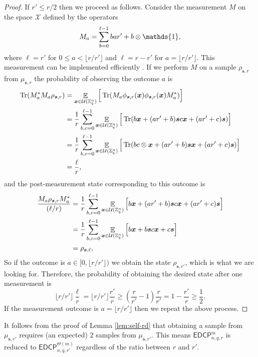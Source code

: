 \documentclass[11pt]{article}
\theoremstyle{plain}
\theoremstyle{definition}
\DeclareMathOperator{\tr}{Tr} %
\DeclareMathOperator{\E}{\mathbb{E}}
\let\ket\relax
\DeclarePairedDelimiter{\ket}{\lvert}{\rangle}
\let\bra\relax
\DeclarePairedDelimiter{\bra}{\langle}{\rvert}
\def\Z{\mathbb{Z}}
\def\edcp{\mathsf{EDCP}}
\def\X{\mathcal{X}}
\def\U{\mathcal{U}}
\begin{document}
\begin{proof}
    If $r' \le r / 2$ then we proceed as follows. Consider the measurement $M$ on the space $\X$ defined by the operators
    \[ M_a = \sum_{b = 0}^{\ell - 1} \ket{b}\bra{ar' + b} \otimes \mathds{1}, \]
    where $\ell = r'$ for $0 \le a < \lfloor r / r'  \rfloor$ and $\ell = r - r'$ for $a = \lfloor r / r'  \rfloor$. This measurement can be implemented efficiently \cite[\S A.8]{kaye2007introduction}. If we perform $M$ on a sample $\rho_{\bm{s}, r}$ from $\mu_{\bm{s}, r}$ the probability of observing the outcome $a$ is
    \begin{align*}
        \tr(M_a^*M_a \rho_{\bm{s}, r})
        & = \E_{\bm{x} \in \U(\Z_q^n)} \Big[ \tr(M_a \ket{\phi_{\bm{s}, r}(\bm{x})} \bra{\phi_{\bm{s}, r}(\bm{x})} M_a^*) \Big] \\
        & = \frac{1}{r} \sum_{b, c = 0}^{\ell - 1} \E_{\bm{x} \in \U(\Z_q^n)}\Big[ \tr(\ket{b}\ket{\bm{x} + (ar' + b)\bm{s}} \bra{c}\bra{\bm{x} + (ar' + c)\bm{s}}) \Big] \\
        & = \frac{1}{r} \sum_{b, c = 0}^{\ell - 1} \E_{\bm{x} \in \U(\Z_q^n)}\Big[ \tr(\ket{b}\bra{c} \otimes \ket{\bm{x} + (ar' + b)\bm{s}} \bra{\bm{x} + (ar' + c)\bm{s}}) \Big] \\
        & = \frac{\ell}{r},
    \end{align*}
    and the post-measurement state corresponding to this outcome is
    \begin{align*}
        \frac{M_a \rho_{\bm{s}, r} M_a^*}{(\ell / r)}
        & = \frac{1}{r} \sum_{b, c = 0}^{\ell - 1} \E_{\bm{x} \in \U(\Z_q^n)}\Big[ \ket{b}\ket{\bm{x} + (ar' + b)\bm{s}} \bra{c}\bra{\bm{x} + (ar' + c)\bm{s}} \Big] \\
        & = \frac{1}{r} \sum_{b, c = 0}^{\ell - 1} \E_{\bm{x} \in \U(\Z_q^n)}\Big[ \ket{b}\ket{\bm{x} + b\bm{s}} \bra{c}\bra{\bm{x} + c\bm{s}} \Big] \\
        & = \rho_{\bm{s}, \ell},
    \end{align*}
    So if the outcome is $a \in [0, \lfloor r / r'  \rfloor)$ we obtain the state $\rho_{\bm{s}, r'}$, which is what we are looking for. Therefore, the probability of obtaining the desired state after one measurement is
    \[ \lfloor r / r' \rfloor \frac{\ell}{r} = \lfloor r / r' \rfloor \frac{r'}{r} \ge \left( \frac{r}{r'} - 1 \right)\frac{r}{r'} = 1 - \frac{r'}{r} \ge \frac{1}{2}. \]
    If the measurement outcome is $a = \lfloor r / r' \rfloor$ then we repeat the above process.
\end{proof}
It follows from the proof of Lemma \ref{lem:self-rd} that obtaining a sample from $\mu_{\bm{s}, r'}$ requires (an expected) $2$ samples from $\mu_{\bm{s}, r'}$. This means $\edcp_{n, q, r}^m$ is reduced to $\edcp_{n, q, r'}^{\Theta(m)}$ regardless of the ratio between $r$ and $r'$.
\end{document}
